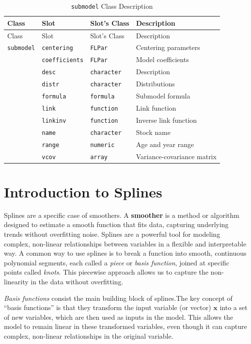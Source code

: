 \documentclass[
]{book}
\begin{document}
\begin{longtable}[]{@{}llll@{}}
\caption{\label{tab:submodelclass} \texttt{submodel} Class Description}\tabularnewline
\toprule\noalign{}
Class & Slot & Slot's Class & Description \\
\midrule\noalign{}
\endfirsthead
\toprule\noalign{}
Class & Slot & Slot's Class & Description \\
\midrule\noalign{}
\endhead
\bottomrule\noalign{}
\endlastfoot
\texttt{submodel} & \texttt{centering} & \texttt{FLPar} & Centering parameters \\
& \texttt{coefficients} & \texttt{FLPar} & Model coefficients \\
& \texttt{desc} & \texttt{character} & Description \\
& \texttt{distr} & \texttt{character} & Distributions \\
& \texttt{formula} & \texttt{formula} & Submodel formula \\
& \texttt{link} & \texttt{function} & Link function \\
& \texttt{linkinv} & \texttt{function} & Inverse link function \\
& \texttt{name} & \texttt{character} & Stock name \\
& \texttt{range} & \texttt{numeric} & Age and year range \\
& \texttt{vcov} & \texttt{array} & Variance-covariance matrix \\
\end{longtable}

\hypertarget{introduction-to-splines}{%
\chapter{Introduction to Splines}\label{introduction-to-splines}}

Splines are a specific case of smoothers. A \textbf{smoother} is a method or algorithm designed to estimate a smooth function that fits data, capturing underlying trends without overfitting noise. Splines are a powerful tool for modeling complex, non-linear relationships between variables in a flexible and interpretable way. A common way to use splines is to break a function into smooth, continuous polynomial segments, each called a \emph{piece} or \emph{basis function}, joined at specific points called \emph{knots}. This piecewise approach allows us to capture the non-linearity in the data without overfitting.

\emph{Basis functions} consist the main building block of splines.The key concept of ``basis functions'' is that they transform the input variable (or vector) \(\mathbf{x}\) into a set of new variables, which are then used as inputs in the model. This allows the model to remain linear in these transformed variables, even though it can capture complex, non-linear relationships in the original variable.
\end{document}

